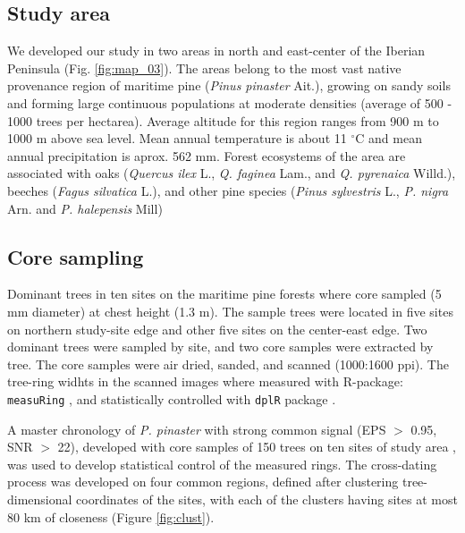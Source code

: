 \documentclass[review,authoryear]{elsarticle}
\begin{document}
\subsection{Study area}
We developed our study in two areas in north and east-center of the
Iberian Peninsula (Fig. \ref{fig:map_03}). The areas belong to the
most vast native provenance region of maritime pine (\textit{Pinus
  pinaster} Ait.), growing on sandy soils and forming large continuous
populations at moderate densities (average of 500 - 1000 trees per
hectarea).
Average altitude for this region ranges from 900 m to 1000 m above sea
level. Mean annual temperature is about 11 $^{\circ}$C and mean annual
precipitation is aprox. 562 mm. %
Forest ecosystems of the area are associated with oaks
(\textit{Quercus ilex} L., \textit{Q. faginea} Lam., and
\textit{Q. pyrenaica} Willd.), beeches (\textit{Fagus silvatica} L.),
and other pine species (\textit{Pinus sylvestris} L.,
\textit{P. nigra} Arn. and \textit{P.  halepensis} Mill)

\subsection{Core sampling}
Dominant trees in ten sites on the maritime pine forests where core
sampled (5 mm diameter) at chest height (1.3 m). The sample trees were
located in five sites on northern study-site edge and other five sites
on the center-east edge. Two dominant trees were sampled by site, and
two core samples were extracted by tree. The core samples were air
dried, sanded, and scanned (1000:1600 ppi). The tree-ring widhts in
the scanned images where measured with R-package: {\tt measuRing}
\citep{Lara2015}, and statistically controlled with {\tt dplR} package
\citep{Bunn2010}.

A master chronology of \textit{P. pinaster} with strong common signal
(EPS $>$ 0.95, SNR $>$ 22), developed with core samples of 150 trees
on ten sites of study area \citep{Bogino2008}, was used to develop
statistical control of the measured rings. The cross-dating process
was developed on four common regions, defined after clustering
tree-dimensional coordinates of the sites, with each of the clusters
having sites at most 80 km of closeness (Figure \ref{fig:clust}).
\end{document}
